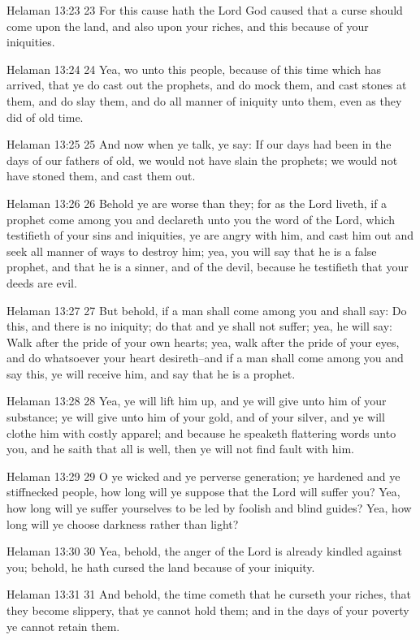 Helaman 13:23
 23 For this cause hath the Lord God caused that a curse should
come upon the land, and also upon your riches, and this because
of your iniquities.

Helaman 13:24
 24 Yea, wo unto this people, because of this time which has
arrived, that ye do cast out the prophets, and do mock them, and
cast stones at them, and do slay them, and do all manner of
iniquity unto them, even as they did of old time.

Helaman 13:25
 25 And now when ye talk, ye say: If our days had been in the
days of our fathers of old, we would not have slain the prophets;
we would not have stoned them, and cast them out.

Helaman 13:26
 26 Behold ye are worse than they; for as the Lord liveth, if a
prophet come among you and declareth unto you the word of the
Lord, which testifieth of your sins and iniquities, ye are angry
with him, and cast him out and seek all manner of ways to destroy
him; yea, you will say that he is a false prophet, and that he is
a sinner, and of the devil, because he testifieth that your deeds
are evil.

Helaman 13:27
 27 But behold, if a man shall come among you and shall say: Do
this, and there is no iniquity; do that and ye shall not suffer;
yea, he will say: Walk after the pride of your own hearts; yea,
walk after the pride of your eyes, and do whatsoever your heart
desireth--and if a man shall come among you and say this, ye will
receive him, and say that he is a prophet.

Helaman 13:28
 28 Yea, ye will lift him up, and ye will give unto him of your
substance; ye will give unto him of your gold, and of your
silver, and ye will clothe him with costly apparel; and because
he speaketh flattering words unto you, and he saith that all is
well, then ye will not find fault with him.

Helaman 13:29
 29 O ye wicked and ye perverse generation; ye hardened and ye
stiffnecked people, how long will ye suppose that the Lord will
suffer you? Yea, how long will ye suffer yourselves to be led by
foolish and blind guides? Yea, how long will ye choose darkness
rather than light?

Helaman 13:30
 30 Yea, behold, the anger of the Lord is already kindled against
you; behold, he hath cursed the land because of your iniquity.

Helaman 13:31
 31 And behold, the time cometh that he curseth your riches, that
they become slippery, that ye cannot hold them; and in the days
of your poverty ye cannot retain them.

